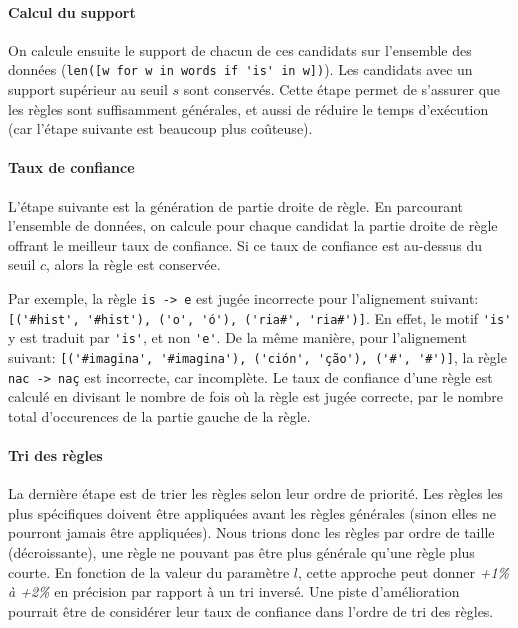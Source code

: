 \documentclass{article}
\begin{document}
\paragraph{Calcul du support}
On calcule ensuite le support de chacun de ces candidats sur l'ensemble des données (\verb|len([w for w in words if 'is' in w])|).
Les candidats avec un support supérieur au seuil $s$ sont conservés. Cette étape permet de s'assurer que les règles sont suffisamment générales, et aussi de réduire le temps d'exécution (car l'étape suivante est beaucoup plus coûteuse).

\paragraph{Taux de confiance}
L'étape suivante est la génération de partie droite de règle. En parcourant l'ensemble de données, on calcule pour chaque candidat la partie droite de règle offrant le meilleur taux de confiance. Si ce taux de confiance est au-dessus du seuil $c$, alors la règle est conservée.

Par exemple, la règle \verb|is -> e| est jugée incorrecte pour l'alignement suivant: \verb|[('#hist', '#hist'), ('o', 'ó'), ('ria#', 'ria#')]|. En effet, le motif \verb|'is'| y est traduit par \verb|'is'|, et non \verb|'e'|.
De la même manière, pour l'alignement suivant: \verb|[('#imagina', '#imagina'), ('ción', 'ção'), ('#', '#')]|, la règle \verb|nac -> naç| est incorrecte, car incomplète. Le taux de confiance d'une règle est calculé en divisant le nombre de fois où la règle est jugée correcte, par le nombre total d'occurences de la partie gauche de la règle.

\paragraph{Tri des règles}
La dernière étape est de trier les règles selon leur ordre de priorité. Les règles les plus spécifiques doivent être appliquées avant les règles générales (sinon elles ne pourront jamais être appliquées). Nous trions donc les règles par ordre de taille (décroissante), une règle ne pouvant pas être plus générale qu'une règle plus courte. En fonction de la valeur du paramètre $l$, cette approche peut donner \emph{+1\% à +2\%} en précision par rapport à un tri inversé.
Une piste d'amélioration pourrait être de considérer leur taux de confiance dans l'ordre de tri des règles.
\end{document}
